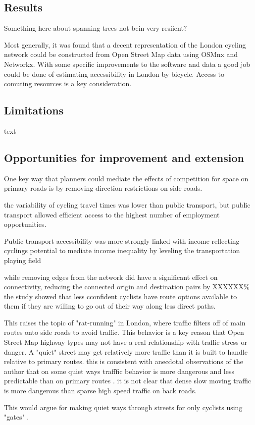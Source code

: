 \subsection{Results}

Something here about spanning trees not bein very resiient? 

Most generally, it was found that a decent representation of the London cycling network could be constructed from Open Street Map data using OSMnx and Networkx. With some specific improvements to the software and data a good job could be done of estimating accessibility in London by bicycle. Access to comuting resources is a key consideration.

\subsection{Limitations}

text

\subsection{Opportunities for improvement and extension}


One key way that planners could mediate the effects of competition for space on primary roads is by removing direction restrictions on side roads. 

the variability of cycling travel times was lower than public transport, but public transport allowed efficient access to the highest number of employment opportunities. 


Public transport accessibility was more strongly linked with income reflecting cyclings potential to mediate income inequality by leveling the transportation playing field

while removing edges from the network did have a significant effect on connectivity, reducing the connected origin and destination pairs by XXXXXX\% the study showed that less cconfident cyclists have route options available to them if they are willing to go out of their way along less direct paths. 


This raises the topic of "rat-running" in London, where traffic filters off of main routes onto side roads to avoid traffic. This behavior is a key reason that Open Street Map highway types may not have a real relationship with traffic stress or danger. A "quiet" street may get relatively more traffic than it is built to handle relative to primary routes. this is consistent with anecdotal observations of the author that on some quiet ways trafffic behavior is more dangerous and less predictable than on primary routes . it is not clear that dense slow moving traffic is more dangerous than sparse high speed traffic on back roads. 

This would argue for making quiet ways through streets for only cyclists using "gates" .